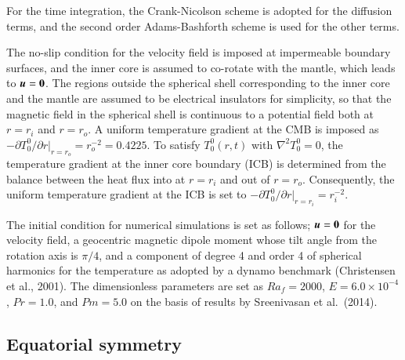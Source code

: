 For the time integration, the Crank-Nicolson scheme is adopted for the diffusion terms, and the second order Adams-Bashforth scheme is used for the other terms.

The no-slip condition for the velocity field is imposed at impermeable boundary surfaces, and the inner core is assumed to co-rotate with the mantle, which leads to $\mbox{\boldmath$u$} = {\bf 0}$.
The regions outside the spherical shell corresponding to the inner core and the mantle are assumed to be electrical insulators for simplicity, so that the magnetic field in the spherical shell is continuous to a potential field both at $r = r_i$ and $r = r_o$.
{\color{red}
A
}
uniform temperature gradient at the CMB is imposed as $-\partial T_0^0 / \partial r |_{r = r_o} = r_{o}^{-2} = 0.4225$. 
To satisfy $T_0^0 (r, t)$ with $\nabla^2 T_0^0 = 0$,
the temperature gradient at the inner core boundary (ICB) is determined from the balance between the heat flux into at $r = r_i$ and out of $r = r_o$. 
Consequently, the uniform temperature gradient at the ICB is set to $-\partial T_0^0 / \partial r |_{r = r_i} = r_i^{-2}$.

The initial condition for numerical simulations is set as follows; $\mbox{\boldmath$u$} = {\bf 0}$ for the velocity field, a geocentric magnetic dipole moment whose tilt angle from the rotation axis is $\pi / 4$, and a component of degree 4 and order 4 of spherical harmonics for the temperature as adopted by a dynamo benchmark (Christensen et al., 2001).
{\color{teal}
The dimensionless parameters are set as $Ra_f = 2000$, $E = 6.0 \times 10^{-4}$, $Pr = 1.0$, and $Pm = 5.0$ on the basis of results by Sreenivasan et al.\ (2014).
}

\subsection{Equatorial symmetry}

